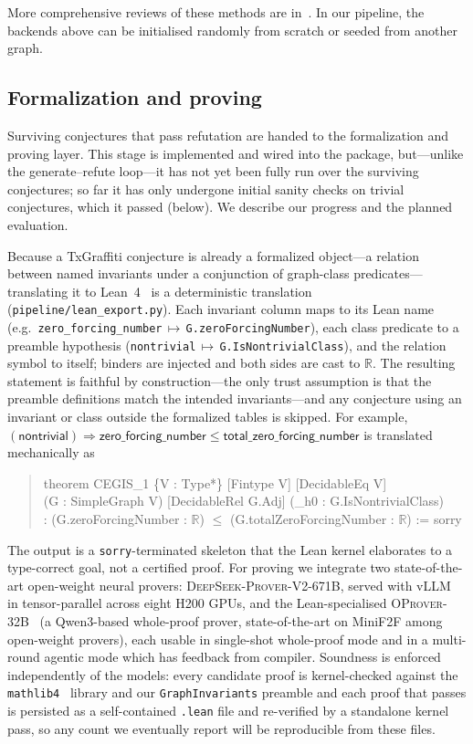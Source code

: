 \documentclass[]{ceurart}
\begin{document}
More comprehensive reviews of these methods are in~\cite{jooken2025computer,wagner2021constructions}. In our pipeline, the backends above can be initialised randomly from scratch or seeded from another graph.

\subsection{Formalization and proving}
\label{sec:formalize-prove}
Surviving conjectures that pass refutation are handed to the formalization and proving layer. This stage
is implemented and wired into the package, but---unlike the generate--refute loop---it has not yet been fully
run over the surviving conjectures; so far it has only undergone initial sanity checks on trivial
conjectures, which it passed (below). We describe our progress and the planned evaluation.

Because a TxGraffiti conjecture is already a formalized object---a relation between named invariants
under a conjunction of graph-class predicates---translating it to Lean~4~\cite{moura2015lean} is a deterministic translation
(\texttt{pipeline/lean\_export.py}). Each invariant column maps to its Lean name (e.g.\
\texttt{zero\_forcing\_number}\,$\mapsto$\,\texttt{G.zeroForcingNumber}), each class predicate to a
preamble hypothesis (\texttt{nontrivial}\,$\mapsto$\,\texttt{G.IsNontrivialClass}), and the relation
symbol to itself; binders are injected and both sides are cast to $\mathbb{R}$. The resulting statement is
faithful by construction---the only trust assumption is that the preamble definitions match the
intended invariants---and any conjecture using an invariant or class outside the formalized tables is
skipped. For example, 
$(\textsf{nontrivial})\Rightarrow\textsf{zero\_forcing\_number}\le\textsf{total\_zero\_forcing\_number}$
is translated mechanically as
\begin{quote}\small\ttfamily\noindent
theorem CEGIS\_1 \{V : Type*\} [Fintype V] [DecidableEq V]\\
\null\quad(G : SimpleGraph V) [DecidableRel G.Adj] (\_h0 : G.IsNontrivialClass)\\
\null\quad: (G.zeroForcingNumber : $\mathbb{R}$) $\le$ (G.totalZeroForcingNumber : $\mathbb{R}$) := sorry
\end{quote}
The output is a \texttt{sorry}-terminated skeleton that the Lean kernel elaborates to a type-correct goal,
not a certified proof. For proving we integrate two
state-of-the-art open-weight neural provers: \textsc{DeepSeek-Prover-V2-671B}, served with
vLLM~\cite{kwon2023vllm} in tensor-parallel across eight H200 GPUs, and the Lean-specialised
\textsc{OProver-32B}~\cite{oprover2026} (a Qwen3-based whole-proof prover, state-of-the-art on MiniF2F
among open-weight provers), each usable in single-shot whole-proof mode and in a multi-round
agentic mode which has feedback from compiler. Soundness is enforced
independently of the models: every candidate proof is kernel-checked against the
\texttt{mathlib4}~\cite{vandoorn2020maintaining} library and our \texttt{GraphInvariants} preamble and each proof that passes is persisted as a self-contained \texttt{.lean} file and re-verified by a standalone kernel pass, so any count we eventually
report will be reproducible from these files.
\end{document}
